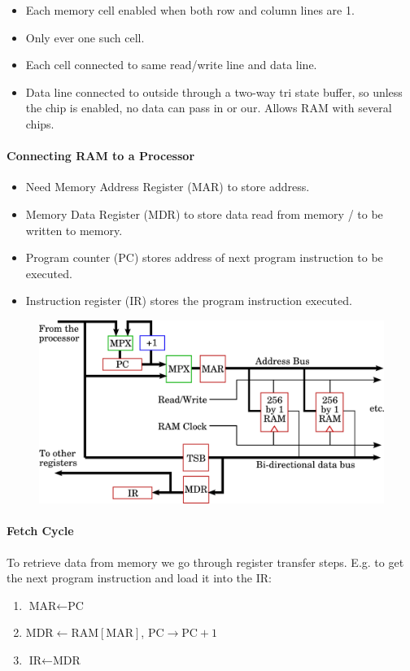 \documentclass[twocolumn,english]{article}
\begin{document}
\begin{itemize}
\item Each memory cell enabled when both row and column lines are 1.
\item Only ever one such cell. 
\item Each cell connected to same read/write line and data line.
\item Data line connected to outside through a two-way tri state buffer,
so unless the chip is enabled, no data can pass in or our. Allows
RAM with several chips.
\end{itemize}

\paragraph{Connecting RAM to a Processor}
\begin{itemize}
\item Need Memory Address Register (MAR) to store address.
\item Memory Data Register (MDR) to store data read from memory / to be
written to memory.
\item Program counter (PC) stores address of next program instruction to
be executed.
\item Instruction register (IR) stores the program instruction executed.
\end{itemize}
\begin{figure}[H]
\noindent \centering{}\includegraphics[width=0.3\paperwidth]{img/mem-proc}
\end{figure}



\paragraph{Fetch Cycle}

To retrieve data from memory we go through register transfer steps.
E.g. to get the next program instruction and load it into the IR:
\begin{enumerate}
\item $\mbox{MAR}\leftarrow\mbox{PC}$
\item $\mbox{MDR}\leftarrow\mbox{RAM}\left[\mbox{MAR}\right]$, $\mbox{PC}\rightarrow\mbox{PC}+1$
\item $\mbox{IR}\leftarrow\mbox{MDR}$
\end{enumerate}
\end{document}
